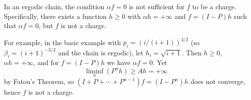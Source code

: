 In an ergodic chain, the condition $\alpha f = 0$ is not sufficient for $f$ to be a charge. Specifically, there exists a function $h \geq 0$ with $\alpha h = +\infty$ and $f = (I-P)h$ such that $\alpha f = 0$, but $f$ is not a charge.

For example, in the basic example with $p_i = (i/(i+1))^{3/2}$ (so $\beta_i = (i+1)^{-3/2}$ and the chain is ergodic), let $h_i = \sqrt{i+1}$. Then $h \geq 0$, $\alpha h = +\infty$, and for $f = (I-P)h$ we have $\alpha f = 0$. Yet
$$\liminf_n (P^n h) \geq A h = +\infty$$
by Fatou's Theorem, so $(I + P + \cdots + P^{n-1})f = (I - P^n)h$ does not converge, hence $f$ is not a charge.
